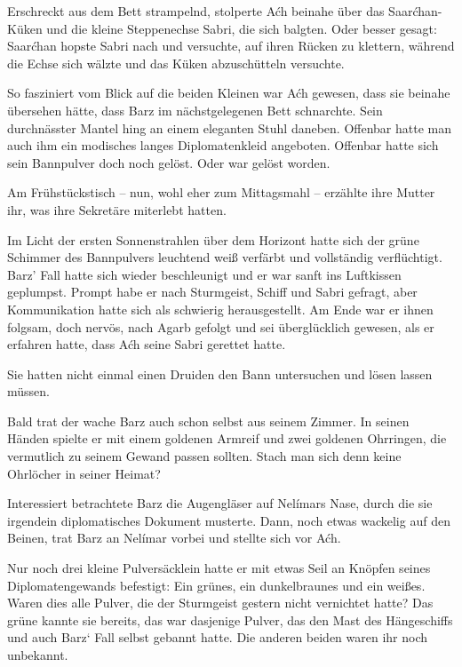 Erschreckt aus dem Bett strampelnd, stolperte Aćh beinahe über das Saarćhan-Küken und die kleine Steppenechse Sabri, die sich balgten. Oder besser gesagt: Saarćhan hopste Sabri nach und versuchte, auf ihren Rücken zu klettern, während die Echse sich wälzte und das Küken abzuschütteln versuchte.

So fasziniert vom Blick auf die beiden Kleinen war Aćh gewesen, dass sie beinahe übersehen hätte, dass Barz im nächstgelegenen Bett schnarchte. Sein durchnässter Mantel hing an einem eleganten Stuhl daneben. Offenbar hatte man auch ihm ein modisches langes Diplomatenkleid angeboten. Offenbar hatte sich sein Bannpulver doch noch gelöst. Oder war gelöst worden.

Am Frühstückstisch – nun, wohl eher zum Mittagsmahl – erzählte ihre Mutter ihr, was ihre Sekretäre miterlebt hatten.

Im Licht der ersten Sonnenstrahlen über dem Horizont hatte sich der grüne Schimmer des Bannpulvers leuchtend weiß verfärbt und vollständig verflüchtigt. Barz’ Fall hatte sich wieder beschleunigt und er war sanft ins Luftkissen geplumpst. Prompt habe er nach Sturmgeist, Schiff und Sabri gefragt, aber Kommunikation hatte sich als schwierig herausgestellt. Am Ende war er ihnen folgsam, doch nervös, nach Agarb gefolgt und sei überglücklich gewesen, als er erfahren hatte, dass Aćh seine Sabri gerettet hatte.

Sie hatten nicht einmal einen Druiden den Bann untersuchen und lösen lassen müssen.



\trennzeichen



Bald trat der wache Barz auch schon selbst aus seinem Zimmer. In seinen Händen spielte er mit einem goldenen Armreif und zwei goldenen Ohrringen, die vermutlich zu seinem Gewand passen sollten. Stach man sich denn keine Ohrlöcher in seiner Heimat?

Interessiert betrachtete Barz die Augengläser auf Nelímars Nase, durch die sie irgendein diplomatisches Dokument musterte. Dann, noch etwas wackelig auf den Beinen, trat Barz an Nelímar vorbei und stellte sich vor Aćh.

Nur noch drei kleine Pulversäcklein hatte er mit etwas Seil an Knöpfen seines Diplomatengewands befestigt: Ein grünes, ein dunkelbraunes und ein weißes. Waren dies alle Pulver, die der Sturmgeist gestern nicht vernichtet hatte? Das grüne kannte sie bereits, das war dasjenige Pulver, das den Mast des Hängeschiffs und auch Barz‘ Fall selbst gebannt hatte. Die anderen beiden waren ihr noch unbekannt.

